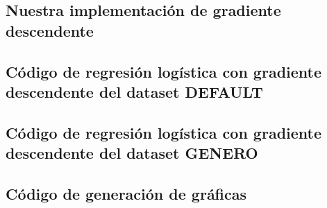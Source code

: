 \documentclass[sigconf,authorversion,nonacm]{acmart}
\begin{document}
\begin{figure*}
  \section{Nuestra implementación de gradiente descendente}
  
\end{figure*}

\begin{figure*}
  \section{Código de regresión logística con gradiente descendente del dataset DEFAULT}
  
\end{figure*}

\begin{figure*}
  \section{Código de regresión logística con gradiente descendente del dataset GENERO}
  
\end{figure*}

\begin{figure*}
  \section{Código de generación de gráficas}
  
\end{figure*}
\end{document}
